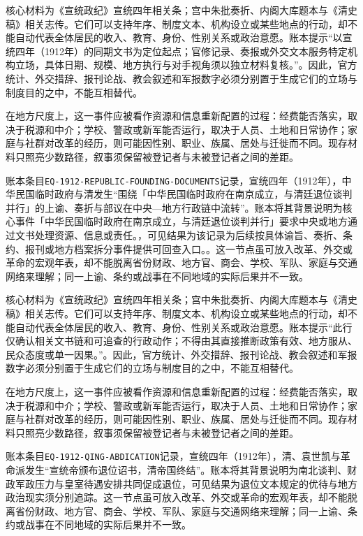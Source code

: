 核心材料为《宣统政纪》宣统四年相关条；宫中朱批奏折、内阁大库题本与《清史稿》相关志传。它们可以支持年序、制度文本、机构设立或某些地点的行动，却不能自动代表全体居民的收入、教育、身份、性别关系或政治意愿。账本提示“以宣统四年（1912年）的同期文书为定位起点；官修记录、奏报或外交文本服务特定机构立场，具体日期、规模、地方执行与对手视角须以独立材料复核。”。因此，官方统计、外交措辞、报刊论战、教会叙述和军报数字必须分别置于生成它们的立场与制度目的之中，不能互相替代。

在地方尺度上，这一事件应被看作资源和信息重新配置的过程：经费能否落实，取决于税源和中介；学校、警政或新军能否运行，取决于人员、土地和日常协作；家庭与社群对改革的经历，则可能因性别、职业、族属、居处与迁徙而不同。现存材料只照亮少数路径，叙事须保留被登记者与未被登记者之间的差距。

账本条目\texttt{EQ-1912-REPUBLIC-FOUNDING-DOCUMENTS}记录，宣统四年（1912年），中华民国临时政府与清发生“围绕「中华民国临时政府在南京成立，与清廷退位谈判并行」的上谕、奏折与部议在中央—地方行政链中流转”。账本将其背景说明为核心事件「中华民国临时政府在南京成立，与清廷退位谈判并行」要求中央或地方通过文书处理资源、信息或责任。，可见结果为该记录为后续按具体谕旨、奏折、条约、报刊或地方档案拆分事件提供可回查入口。。这一节点虽可放入改革、外交或革命的宏观年表，却不能脱离省份财政、地方官、商会、学校、军队、家庭与交通网络来理解；同一上谕、条约或战事在不同地域的实际后果并不一致。

核心材料为《宣统政纪》宣统四年相关条；宫中朱批奏折、内阁大库题本与《清史稿》相关志传。它们可以支持年序、制度文本、机构设立或某些地点的行动，却不能自动代表全体居民的收入、教育、身份、性别关系或政治意愿。账本提示“此行仅确认相关文书链和可追查的行政动作；不得由其直接推断政策有效、地方服从、民众态度或单一因果。”。因此，官方统计、外交措辞、报刊论战、教会叙述和军报数字必须分别置于生成它们的立场与制度目的之中，不能互相替代。

在地方尺度上，这一事件应被看作资源和信息重新配置的过程：经费能否落实，取决于税源和中介；学校、警政或新军能否运行，取决于人员、土地和日常协作；家庭与社群对改革的经历，则可能因性别、职业、族属、居处与迁徙而不同。现存材料只照亮少数路径，叙事须保留被登记者与未被登记者之间的差距。

账本条目\texttt{EQ-1912-QING-ABDICATION}记录，宣统四年（1912年），清、袁世凯与革命派发生“宣统帝颁布退位诏书，清帝国终结”。账本将其背景说明为南北谈判、财政军政压力与皇室待遇安排共同促成退位，可见结果为退位文本规定的优待与地方政治现实须分别追踪。这一节点虽可放入改革、外交或革命的宏观年表，却不能脱离省份财政、地方官、商会、学校、军队、家庭与交通网络来理解；同一上谕、条约或战事在不同地域的实际后果并不一致。

